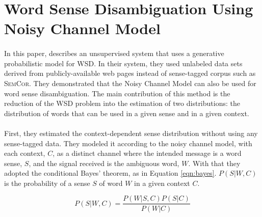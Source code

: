 \section{Word Sense Disambiguation Using Noisy Channel Model}
\paragraph{}
In this paper, \cite{noisychannel} describes an unsupervised system that uses a generative probabilistic model for WSD. In their system, they used unlabeled data sets derived from publicly-available web pages instead of sense-tagged corpus such as \textsc{SemCor}. They demonstrated that the Noisy Channel Model can also be used for word sense disambiguation. The main contribution of this method is the reduction of the WSD problem into the estimation of two distributions: the distribution of words that can be used in a given sense and in a given context.
\paragraph{}
First, they estimated the context-dependent sense distribution without using any sense-tagged data. They modeled it according to the noisy channel model, with each context, $C$, as a distinct channel where the intended message is a word sense, $S$, and the signal received is the ambiguous word, $W$. With that they adopted the conditional Bayes' theorem, as in Equation \ref{eqn:bayes}. $P(S|W,C)$ is the probability of a sense $S$ of word $W$ in a given context $C$.

\begin{equation}
\label{eqn:bayes}
P(S|W,C) = \frac{P(W|S,C)P(S|C)}{P(W|C)}
\end{equation}

